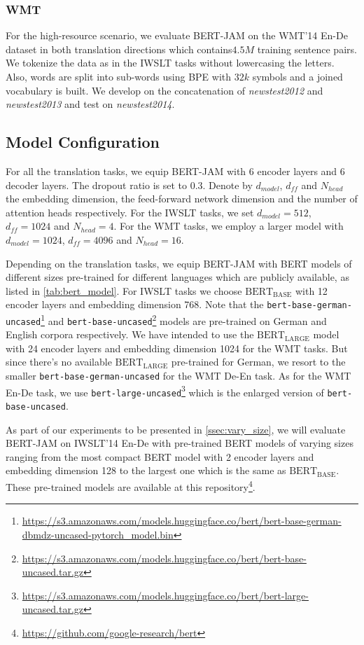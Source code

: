 \documentclass[review]{elsarticle}
\begin{document}
\subsubsection{WMT}
For the high-resource scenario, we evaluate BERT-JAM on the WMT'14 En-De dataset in both translation directions which contains$4.5M$ training sentence pairs. We tokenize the data as in the IWSLT tasks without lowercasing the letters. Also, words are split into sub-words using BPE with $32k$ symbols and a joined vocabulary is built. We develop on the concatenation of \emph{newstest2012} and \emph{newstest2013} and test on \emph{newstest2014}.

\subsection{Model Configuration}
For all the translation tasks, we equip BERT-JAM with 6 encoder layers and 6 decoder layers. The dropout ratio is set to 0.3.
Denote by $d_{model}$, $d_{ff}$ and $N_{head}$ the embedding dimension, the feed-forward network dimension and the number of attention heads respectively. For the IWSLT tasks, we set $d_{model}=512$, $d_{ff}=1024$ and $N_{head}=4$. For the WMT tasks, we employ a larger model with $d_{model}=1024$, $d_{ff}=4096$ and $N_{head}=16$.

Depending on the translation tasks, we equip BERT-JAM with BERT models of different sizes pre-trained for different languages which are publicly available, as listed in \cref{tab:bert_model}. For IWSLT tasks we choose $\text{BERT}_{\text{BASE}}$ with 12 encoder layers and embedding dimension 768. Note that the \texttt{bert-base-german-uncased}\footnote{\url{https://s3.amazonaws.com/models.huggingface.co/bert/bert-base-german-dbmdz-uncased-pytorch_model.bin}} and \texttt{bert-base-uncased}\footnote{\url{https://s3.amazonaws.com/models.huggingface.co/bert/bert-base-uncased.tar.gz}} models are pre-trained on German and English corpora respectively.
We have intended to use the $\text{BERT}_{\text{LARGE}}$ model with 24 encoder layers and embedding dimension 1024 for the WMT tasks. But since there's no available $\text{BERT}_{\text{LARGE}}$ pre-trained for German, we resort to the smaller \texttt{bert-base-german-uncased} for the WMT De-En task. As for the WMT En-De task, we use \texttt{bert-large-uncased}\footnote{\url{https://s3.amazonaws.com/models.huggingface.co/bert/bert-large-uncased.tar.gz}} which is the enlarged version of \texttt{bert-base-uncased}.


As part of our experiments to be presented in \cref{ssec:vary_size}, we will evaluate BERT-JAM on IWSLT'14 En-De with pre-trained BERT models of varying sizes ranging from the most compact BERT model with 2 encoder layers and embedding dimension 128 to the largest one which is the same as $\text{BERT}_{\text{BASE}}$. These pre-trained models are available at this repository\footnote{\url{https://github.com/google-research/bert}}.
\end{document}
